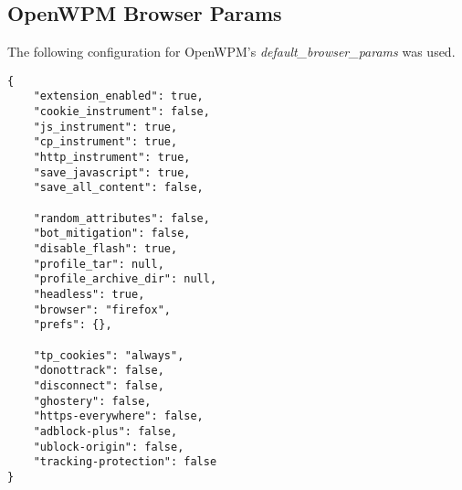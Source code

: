 \documentclass[
    fontsize=12pt,
    headings=small,
    parskip=half,
    bibliography=totoc,
    numbers=noenddot,
    open=any
]{scrreprt}
\begin{document}
\begin{appendices}

\chapter{OpenWPM Browser Params}
\label{app:params}
The following configuration for OpenWPM's \textit{default\_browser\_params} was used.

\begin{verbatim}
{
    "extension_enabled": true,
    "cookie_instrument": false,
    "js_instrument": true,
    "cp_instrument": true,
    "http_instrument": true,
    "save_javascript": true,
    "save_all_content": false,

    "random_attributes": false,
    "bot_mitigation": false,
    "disable_flash": true,
    "profile_tar": null,
    "profile_archive_dir": null,
    "headless": true,
    "browser": "firefox",
    "prefs": {},

    "tp_cookies": "always",
    "donottrack": false,
    "disconnect": false,
    "ghostery": false,
    "https-everywhere": false,
    "adblock-plus": false,
    "ublock-origin": false,
    "tracking-protection": false
}
\end{verbatim}


\end{appendices}

\clearpage

\printbibliography
\end{document}

